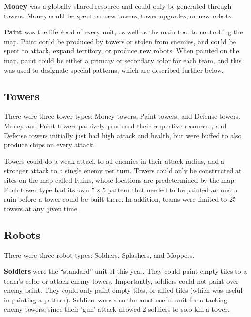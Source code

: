 \documentclass{article}
\begin{document}
  \medskip

  \textbf{Money} was a globally shared resource and could only be generated through towers. Money could be spent on new towers, tower upgrades, or new robots.
  
  \medskip

  \textbf{Paint} was the lifeblood of every unit, as well as the main tool to controlling the map. Paint could be produced by towers or stolen from enemies, and could be spent to attack, expand territory, or produce new robots. When painted on the map, paint could be either a primary or secondary color for each team, and this was used to designate special patterns, which are described further below.

  \subsection{Towers}

  There were three tower types: Money towers, Paint towers, and Defense towers. Money and Paint towers passively produced their respective resources, and Defense towers initially just had high attack and health, but were buffed to also produce chips on every attack.

  \medskip

  Towers could do a weak attack to all enemies in their attack radius, and a stronger attack to a single enemy per turn. Towers could only be constructed at sites on the map called Ruins, whose locations are predetermined by the map. Each tower type had its own $5 \times 5$ pattern that needed to be painted around a ruin before a tower could be built there. In addition, teams were limited to 25 towers at any given time.

  \subsection{Robots}

  There were three robot types: Soldiers, Splashers, and Moppers.

  \medskip

  \textbf{Soldiers} were the ``standard'' unit of this year. They could paint empty tiles to a team's color or attack enemy towers. Importantly, soldiers could not paint over enemy paint. They could only paint empty tiles, or allied tiles (which was useful in painting a pattern). Soldiers were also the most useful unit for attacking enemy towers, since their 'gun' attack allowed 2 soldiers to solo-kill a tower.
\end{document}
